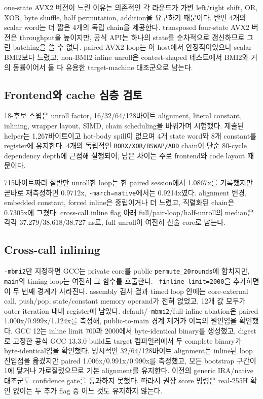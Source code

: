 \documentclass[11pt,a4paper]{article}
\begin{document}
one-state AVX2 버전이 느린 이유는 의존적인 각 라운드가 가변 left/right
shift, OR, XOR, byte shuffle, half permutation, addition을 요구하기
때문이다.  반면 4개의 scalar word는 더 짧은 4개의 독립 chain을 제공한다.
transposed four-state AVX2 버전은 throughput을 높이지만, 공식 API는
하나의 state를 순차적으로 갱신하므로 그런 batching을 쓸 수 없다.  paired
AVX2 loop는 이 host에서 안정적이었으나 scalar BMI2보다 느렸고, non-BMI2
inline unroll은 contest-shaped 테스트에서 BMI2와 거의 동률이어서 둘 다
유용한 target-machine 대조군으로 남는다.

\subsection{Frontend와 cache 심층 검토}

18-후보 스윕은 unroll factor, 16/32/64/128바이트 alignment, literal
constant, inlining, wrapper layout, SIMD, chain scheduling을 바꿔가며
시험했다.  제출된 helper는 1,267바이트이고 hot-body spill이 없으며 4개
state word와 8개 constant를 register에 유지한다.  4개의 독립적인
\texttt{RORX/XOR/BSWAP/ADD} chain이 단순 80-cycle dependency depth에
근접해 실행되어, 남은 차이는 주로 frontend와 code layout 때문이다.

715바이트짜리 절반만 unroll한 loop는 한 paired session에서 1.0867x를
기록했지만 곧바로 재측정하면 0.9712x, \texttt{-march=native}에서는
0.9214x였다.  alignment 변경, embedded constant, forced inline은
중립이거나 더 느렸고, 직렬화된 chain은 0.7305x에 그쳤다.  cross-call
inline flag 아래 full/pair-loop/half-unroll의 median은 각각
37.279/38.618/38.727 ns로, full unroll이 여전히 산술 core로 남는다.

\subsection{Cross-call inlining}

\texttt{-mbmi2}만 지정하면 GCC는 private core를 public
\texttt{permute\_20rounds}에 합치지만, \texttt{main}의 timing loop는
여전히 그 함수를 호출한다.  \texttt{-finline-limit=2000}을 추가하면 이
두 번째 경계가 사라진다.  assembly 검사 결과 timed loop 안에는
core-external call, push/pop, state/constant memory operand가 전혀
없었고, 12개 값 모두가 outer iteration 내내 register에 남았다.
default/\texttt{-mbmi2}/full-inline ablation은 paired
1.000x/0.999x/1.124x를 측정해, public-to-main 경계 제거가 이득의
원인임을 확인했다.  GCC 12는 inline limit 700과 2000에서 byte-identical
binary를 생성했고, digest로 고정한 공식 GCC 13.3.0 build도 target
컴파일러에서 두 complete binary가 byte-identical임을 확인했다.  명시적인
32/64/128바이트 alignment는 inline된 loop 진입점을 옮겼지만 paired
1.006x/0.991x/0.990x를 측정했고, 모든 bootstrap 구간이 1에 닿거나
가로질렀으므로 기본 alignment를 유지한다.  이전의 generic IRA/native
대조군도 confidence gate를 통과하지 못했다.  따라서 권장 score 명령은
real-255H 확인 없이는 두 추가 flag 중 어느 것도 유지하지 않는다.
\end{document}

